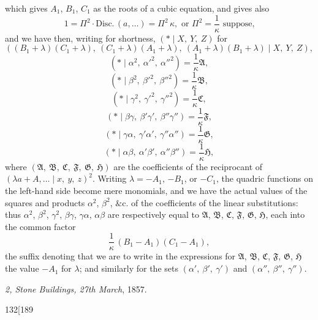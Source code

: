 \documentclass[11pt]{article}
\begin{document}
\noindent which gives $A_{1}$, $B_{1}$, $C_{1}$ as the roots of a cubic equation, and gives also
\[
1 = \Pi^{2}\cdot\mathrm{Disc.}\,(a,\ldots) = \Pi^{2}\,\kappa, \text{ or } \Pi^{2} = \frac{1}{\kappa} \text{ suppose,}
\]
and we have then, writing for shortness, $(*\!\!\mid\! X,\ Y,\ Z)$ for
\[
((B_{1} + \lambda)(C_{1} + \lambda),\ (C_{1} + \lambda)(A_{1} + \lambda),\ (A_{1} + \lambda)(B_{1} + \lambda)\mid X,\ Y,\ Z),
\]
\[
(*\!\!\mid\!\alpha^{2},\ \alpha'^{2},\ \alpha''^{2}) = \frac{1}{\kappa}\mathfrak{A},
\]
\[
(*\!\!\mid\!\beta^{2},\ \beta'^{2},\ \beta''^{2}) = \frac{1}{\kappa}\mathfrak{B},
\]
\[
(*\!\!\mid\!\gamma^{2},\ \gamma'^{2},\ \gamma''^{2}) = \frac{1}{\kappa}\mathfrak{C},
\]
\[
(*\!\!\mid\!\beta\gamma,\ \beta'\gamma',\ \beta''\gamma'') = \frac{1}{\kappa}\mathfrak{F},
\]
\[
(*\!\!\mid\!\gamma\alpha,\ \gamma'\alpha',\ \gamma''\alpha'') = \frac{1}{\kappa}\mathfrak{G},
\]
\[
(*\!\!\mid\!\alpha\beta,\ \alpha'\beta',\ \alpha''\beta'') = \frac{1}{\kappa}\mathfrak{H},
\]
where $(\mathfrak{A},\ \mathfrak{B},\ \mathfrak{C},\ \mathfrak{F},\ \mathfrak{G},\ \mathfrak{H})$ are the coefficients of the reciprocant of $(\lambda a + A,\ldots\mid x,\ y,\ z)^{2}$. Writing $\lambda = -A_{1}$, $-B_{1}$, or $-C_{1}$, the quadric functions on the left-hand side become mere monomials, and we have the actual values of the squares and products $\alpha^{2}$, $\beta^{2}$, $\&\text{c.}$ of the coefficients of the linear substitutions: thus $\alpha^{2}$, $\beta^{2}$, $\gamma^{2}$, $\beta\gamma$, $\gamma\alpha$, $\alpha\beta$ are respectively equal to $\mathfrak{A}$, $\mathfrak{B}$, $\mathfrak{C}$, $\mathfrak{F}$, $\mathfrak{G}$, $\mathfrak{H}$, each into the common factor
\[
\frac{1}{\kappa}\,(B_{1} - A_{1})(C_{1} - A_{1}),
\]
the suffix denoting that we are to write in the expressions for $\mathfrak{A}$, $\mathfrak{B}$, $\mathfrak{C}$, $\mathfrak{F}$, $\mathfrak{G}$, $\mathfrak{H}$ the value $-A_{1}$ for $\lambda$; and similarly for the sets $(\alpha',\ \beta',\ \gamma')$ and $(\alpha'',\ \beta'',\ \gamma'')$.

\medskip

\noindent \emph{2, Stone Buildings, 27th March}, 1857.

\newpage

\begin{center}
\small 132\hfill\textsc{}\hfill[189
\end{center}
\end{document}

